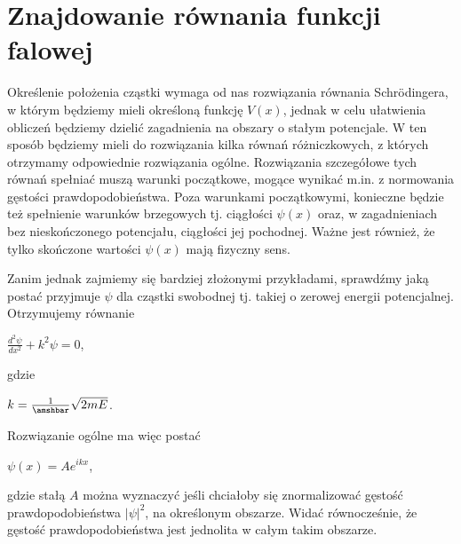 \documentclass{SGGW-thesis}
\begin{document}
	\section{Znajdowanie równania funkcji falowej}
	Określenie położenia cząstki wymaga od nas rozwiązania równania Schrödingera, w którym będziemy mieli określoną funkcję $V(x)$, jednak w celu ułatwienia obliczeń będziemy dzielić zagadnienia na obszary o stałym potencjale. W ten sposób będziemy mieli do rozwiązania kilka równań różniczkowych, z których otrzymamy odpowiednie rozwiązania ogólne. Rozwiązania szczegółowe tych równań spełniać muszą warunki początkowe, mogące wynikać m.in. z normowania gęstości prawdopodobieństwa. Poza warunkami początkowymi, konieczne będzie też spełnienie warunków brzegowych tj. ciągłości $\psi(x)$ oraz, w zagadnieniach bez nieskończonego potencjału, ciągłości jej pochodnej. Ważne jest również, że tylko skończone wartości $\psi(x)$ mają fizyczny sens.
	
	Zanim jednak zajmiemy się bardziej złożonymi przykładami, sprawdźmy jaką postać przyjmuje $\psi$ dla cząstki swobodnej tj. takiej o zerowej energii potencjalnej. Otrzymujemy równanie 
\begin{center}
$\frac{d^2\psi}{dx^2}+k^2\psi=0$,
\end{center}
gdzie
\begin{center}
$k=\frac{1}{\amshbar}\sqrt{2mE}$.
\end{center}
Rozwiązanie ogólne ma więc postać
\begin{center}
$\psi(x)=Ae^{ikx}$,
\end{center}
gdzie stałą $A$ można wyznaczyć jeśli chciałoby się znormalizować gęstość prawdopodobieństwa $|\psi|^2$, na określonym obszarze. Widać równocześnie, że gęstość prawdopodobieństwa jest jednolita w całym takim obszarze.
	
\end{document}
